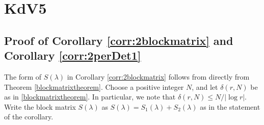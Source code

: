 \documentclass[thesis.tex]{subfiles}
\begin{document}
\iffulldocument\else
	\chapter{KdV5}
\fi

\section{Proof of Corollary \ref{corr:2blockmatrix} and Corollary \ref{corr:2perDet1}}

The form of $S(\lambda)$ in Corollary \ref{corr:2blockmatrix} follows from directly from Theorem \ref{blockmatrixtheorem}. Choose a positive integer $N$, and let $\delta(r, N)$ be as in \cref{blockmatrixtheorem}. In particular, we note that $\delta(r,N) \leq N/|\log r|$. Write the block matrix $S(\lambda)$ as $S(\lambda) = S_1(\lambda) + S_2(\lambda)$ as in the statement of the corollary.
\end{document}
